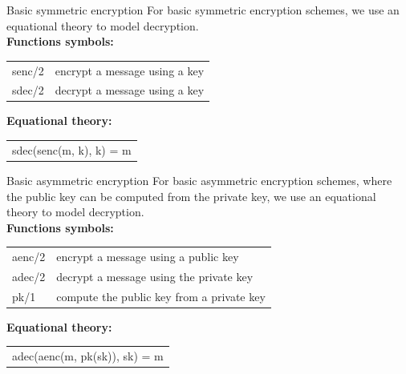 \documentclass[11pt,aspectratio=169]{beamer}
\begin{document}
\begin{frame}[fragile]{Basic symmetric encryption}
    For basic symmetric encryption schemes, we use an equational theory to 
    model decryption.\\[.3cm]

    \textbf{Functions symbols:}
    \begin{table}[]
        \raggedright
        \begin{tabular}{ll}
            \textcolor{TermBlue}{senc/2} & encrypt a message using a key \\
            \textcolor{TermBlue}{sdec/2} & decrypt a message using a key
        \end{tabular}
    \end{table}

    \textbf{Equational theory:}
    \begin{table}[]
        \raggedright
        {\color{TermBlue}
        \begin{tabular}{l}
            sdec(senc(m, k), k) = m
        \end{tabular}}
    \end{table}
\end{frame}

\begin{frame}[fragile]{Basic asymmetric encryption}
    For basic asymmetric encryption schemes, where the public key can be 
    computed from the private key, we use an equational theory to model 
    decryption.\\[.3cm]

    \textbf{Functions symbols:}
    \begin{table}[]
        \raggedright
        \begin{tabular}{ll}
            \textcolor{TermBlue}{aenc/2}
                & encrypt a message using a public key \\
            \textcolor{TermBlue}{adec/2}
                & decrypt a message using the private key \\
            \textcolor{TermBlue}{pk/1}
                & compute the public key from a private key
        \end{tabular}
    \end{table}

    \textbf{Equational theory:}
    \begin{table}[]
        \raggedright
        {\color{TermBlue}
        \begin{tabular}{l}
            adec(aenc(m, pk(sk)), sk) = m
        \end{tabular}}
    \end{table}
\end{frame}
\end{document}
